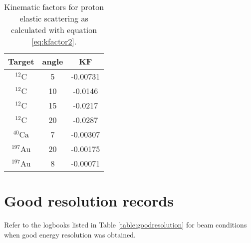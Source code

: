 \documentclass[11pt]{report}
\begin{document}
\begin{table}[!ht]
\centering
\begin{tabular}{|c|c|c|}
\hline
Target & angle & KF\\ 
\hline
\hline
$^{12}$C &  5     &  -0.00731   \\
$^{12}$C &  10    &  -0.0146    \\
$^{12}$C &  15    &  -0.0217    \\
$^{12}$C &  20    &  -0.0287    \\
$^{40}$Ca &  7    &  -0.00307   \\
$^{197}$Au &  20  &  -0.00175   \\
$^{197}$Au &  8   &  -0.00071   \\
\hline
\end{tabular}
\caption{Kinematic factors for proton elastic scattering as calculated with equation \ref{eq:kfactor2}.}
\label{table:KF}
\end{table}


\section{Good resolution records}

Refer to the logbooks listed in Table \ref{table:goodresolution} for
beam conditions when good energy resolution was obtained.
\end{document}
